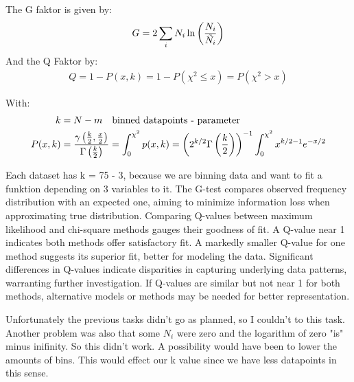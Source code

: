 The G faktor is given by:
\begin{align}
    G = 2\sum_i N_i \ln \left({\frac{N_i}{\Tilde{N_i}}}\right)
\end{align}
And the Q Faktor by:
\begin{align}
    Q = 1-P(x,k) = 1 -P(\chi^2 \leq x) = P(\chi^2>x) 
\end{align}

With:
\begin{align}
    k &= N-m \quad \text{binned datapoints - parameter}\\
    P(x,k) &= \frac{\gamma\left({\frac{k}{2},\frac{x}{2}}\right)}{\Gamma\left({\frac{k}{2}}\right)} = \int_0^{\chi^2} p(x,k) =  \left({2^{k/2}\Gamma\left( \frac{k}{2} \right)}\right)^{-1} \int_0^{\chi^2} x^{k/2-1}e^{-x/2}
\end{align}

Each dataset has k = 75 - 3, because we are binning data and want to fit a funktion depending on 3 variables to it.  
The G-test compares observed frequency distribution with an expected one, aiming to minimize information loss when approximating true distribution. Comparing Q-values between maximum likelihood and chi-square methods gauges their goodness of fit. A Q-value near 1 indicates both methods offer satisfactory fit. A markedly smaller Q-value for one method suggests its superior fit, better for modeling the data. Significant differences in Q-values indicate disparities in capturing underlying data patterns, warranting further investigation. If Q-values are similar but not near 1 for both methods, alternative models or methods may be needed for better representation.

Unfortunately the previous tasks didn't go as planned, so I couldn't to this task. Another problem was also that some $N_i$ were zero and the logarithm of zero "is" minus inifinity. So this didn't work. A possibility would have been to lower the amounts of bins. This would effect our k value since we have less datapoints in this sense. 
